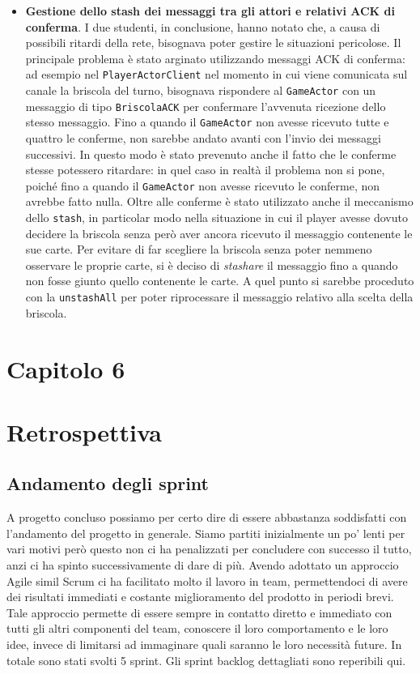 \begin {itemize}
        \item \textbf{Gestione dello stash dei messaggi tra gli attori e relativi ACK di conferma}. I due studenti, in conclusione, hanno notato che, a causa di possibili ritardi della rete, bisognava poter gestire le situazioni pericolose. Il principale problema è stato arginato utilizzando messaggi ACK di conferma: ad esempio nel \texttt{PlayerActorClient} nel momento in cui viene comunicata sul canale la briscola del turno, bisognava rispondere al \texttt{GameActor} con un messaggio di tipo \texttt{BriscolaACK} per confermare l'avvenuta ricezione dello stesso messaggio. Fino a quando il \texttt{GameActor} non avesse ricevuto tutte e quattro le conferme, non sarebbe andato avanti con l'invio dei messaggi successivi. In questo modo è stato prevenuto anche il fatto che le conferme stesse potessero ritardare: in quel caso in realtà il problema non si pone, poiché fino a quando il \texttt{GameActor} non avesse ricevuto le conferme, non avrebbe fatto nulla. Oltre alle conferme è stato utilizzato anche il meccanismo dello \texttt{stash}, in particolar modo nella situazione in cui il player avesse dovuto decidere la briscola senza però aver ancora ricevuto il messaggio contenente le sue carte. Per evitare di far scegliere la briscola senza poter nemmeno osservare le proprie carte, si è deciso di \textit{stashare} il messaggio fino a quando non fosse giunto quello contenente le carte. A quel punto si sarebbe proceduto con la \texttt{unstashAll} per poter riprocessare il messaggio relativo alla scelta della briscola.
   	\end {itemize}
        
        \clearpage
        
 \section*{\Huge {\textbf Capitolo 6}\label{chapter6}}
    \section{Retrospettiva}\label{sec:retrospective}
\subsection{Andamento degli sprint}
A progetto concluso possiamo per certo dire di essere abbastanza soddisfatti con l’andamento del progetto in generale. Siamo partiti inizialmente un po’ lenti per vari motivi però questo non ci ha penalizzati per concludere con successo il tutto, anzi ci ha spinto successivamente di dare di più. 
Avendo adottato un approccio Agile simil Scrum  ci ha facilitato molto il lavoro in team, permettendoci di avere dei risultati immediati e costante miglioramento del prodotto in periodi brevi. Tale approccio permette di essere sempre in contatto diretto e immediato con tutti gli altri componenti del team, conoscere il loro comportamento e le loro idee, invece di limitarsi ad immaginare quali saranno le loro necessità future. In totale sono stati svolti 5 sprint. Gli sprint backlog dettagliati sono reperibili qui.

